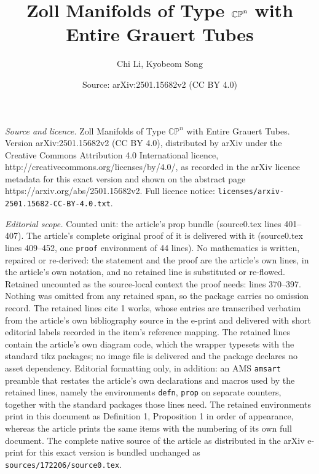 \documentclass[10pt,a4paper]{amsart}
\title{Zoll Manifolds of Type $\bCP$ with Entire Grauert Tubes}
\author{Chi Li, Kyobeom Song}
\date{Source: arXiv:2501.15682v2 (CC BY 4.0)}
\newcommand{\bCP}{\mathbb{CP}^n}
\begin{document}
\maketitle

\noindent\emph{Source and licence.} Zoll Manifolds of Type $\bCP$ with Entire Grauert Tubes. Version arXiv:2501.15682v2 (CC BY 4.0), distributed by arXiv under the Creative Commons Attribution 4.0 International licence, http://creativecommons.org/licenses/by/4.0/, as recorded in the arXiv licence metadata for this exact version and shown on the abstract page https://arxiv.org/abs/2501.15682v2. Full licence notice: \texttt{licenses/arxiv-2501.15682-CC-BY-4.0.txt}.\par\smallskip

\noindent\textit{Editorial scope.} Counted unit: the article's prop bundle (source0.tex lines 401--407). The article's complete original proof of it is delivered with it (source0.tex lines 409--452, one \texttt{proof} environment of 44 lines). No mathematics is written, repaired or re-derived: the statement and the proof are the article's own lines, in the article's own notation, and no retained line is substituted or re-flowed.  Retained uncounted as the source-local context the proof needs: lines 370--397.  Nothing was omitted from any retained span, so the package carries no omission record.  The retained lines cite 1 works, whose entries are transcribed verbatim from the article's own bibliography source in the e-print and delivered with short editorial labels recorded in the item's reference mapping.  The retained lines contain the article's own diagram code, which the wrapper typesets with the standard tikz packages; no image file is delivered and the package declares no asset dependency.  Editorial formatting only, in addition: an AMS \texttt{amsart} preamble that restates the article's own declarations and macros used by the retained lines, namely the environments \texttt{defn}, \texttt{prop} on separate counters, together with the standard packages those lines need.  The retained environments print in this document as Definition 1, Proposition 1 in order of appearance, whereas the article prints the same items with the numbering of its own full document.  The complete native source of the article as distributed in the arXiv e-print for this exact version is bundled unchanged as \texttt{sources/172206/source0.tex}.
\end{document}
